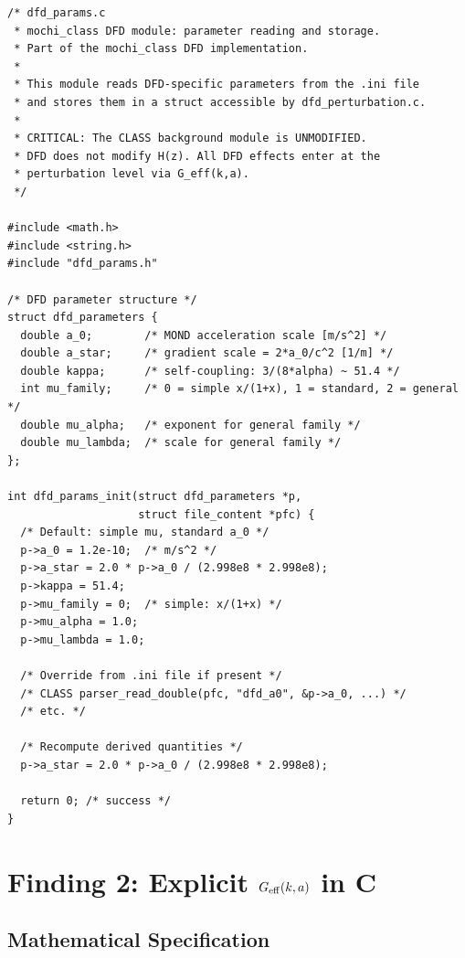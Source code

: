 \documentclass[11pt]{article}
\theoremstyle{definition}
\theoremstyle{remark}
\newcommand{\Geff}{G_{\rm eff}}
\begin{document}
\begin{lstlisting}[caption={\texttt{dfd\_params.c}: DFD parameter handling (complete)},label={lst:dfd-params}]
/* dfd_params.c
 * mochi_class DFD module: parameter reading and storage.
 * Part of the mochi_class DFD implementation.
 *
 * This module reads DFD-specific parameters from the .ini file
 * and stores them in a struct accessible by dfd_perturbation.c.
 *
 * CRITICAL: The CLASS background module is UNMODIFIED.
 * DFD does not modify H(z). All DFD effects enter at the
 * perturbation level via G_eff(k,a).
 */

#include <math.h>
#include <string.h>
#include "dfd_params.h"

/* DFD parameter structure */
struct dfd_parameters {
  double a_0;        /* MOND acceleration scale [m/s^2] */
  double a_star;     /* gradient scale = 2*a_0/c^2 [1/m] */
  double kappa;      /* self-coupling: 3/(8*alpha) ~ 51.4 */
  int mu_family;     /* 0 = simple x/(1+x), 1 = standard, 2 = general */
  double mu_alpha;   /* exponent for general family */
  double mu_lambda;  /* scale for general family */
};

int dfd_params_init(struct dfd_parameters *p,
                    struct file_content *pfc) {
  /* Default: simple mu, standard a_0 */
  p->a_0 = 1.2e-10;  /* m/s^2 */
  p->a_star = 2.0 * p->a_0 / (2.998e8 * 2.998e8);
  p->kappa = 51.4;
  p->mu_family = 0;  /* simple: x/(1+x) */
  p->mu_alpha = 1.0;
  p->mu_lambda = 1.0;

  /* Override from .ini file if present */
  /* CLASS parser_read_double(pfc, "dfd_a0", &p->a_0, ...) */
  /* etc. */

  /* Recompute derived quantities */
  p->a_star = 2.0 * p->a_0 / (2.998e8 * 2.998e8);

  return 0; /* success */
}
\end{lstlisting}


\section{Finding 2: Explicit $\Geff(k,a)$ in C}
\label{sec:geff-c}

\subsection{Mathematical Specification}
\end{document}
